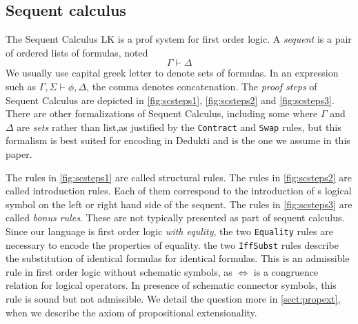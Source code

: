 \documentclass{article}
\begin{document}
	\iffalse
	We consider first order logic with arbitrary constant function and predicate symbols. Fomally We fix:
	\begin{itemize}
		\item a set of constant symbols $C$ noted $f^j, g^j, h^j, f^j_i,...$ for indices $i\in \mathbb{N}$ and where the superscript $j$ denotes the \textit{arity} of the symbol
		\item a countably infinite set of schematic function symbols $'C$ noted $ 'f^j, 'g^j, 'h^j, f^j_i,...$ for indices $i\in \mathbb{N}$ and where the superscript $j$ denotes the \textit{arity} of the symbol.
	\end{itemize}
	We also call schematic functions symbols of arity 0 \textit{variables}, and note them $x,y,z$.
	The set of terms of height at most $n$ is
	$$\mathcal{T}_0 := \lbrace f^0 \mid f^0 \in C\rbrace \cup \lbrace 'f^0 \mid 'f^0 \in C \rbrace$$
	$$\mathcal{T}_{n+1} := \mathcal{T}_n \cup \lbrace f^j(\vec{t}) \mid f^j\in \mathcal{C}, \vec{t}\in \mathcal{T}_n^j, j>0 \rbrace \cup \lbrace 'f^j(\vec{t}) \mid 'f^j\in \mathcal{C}, \vec{t}\in \mathcal{T}_n^j, j>0 \rbrace$$
	and the set of all termsis $\mathcal T = \bigcup_{n=0}^\infty \mathcal{T}_n$.  Moreover, we allow \textit{schematic functions, predicate and connector symbols}.
	
	\fi
	\subsection{Sequent calculus}
	The Sequent Calculus LK is a prof system for first order logic. A \textit{sequent} is a pair of ordered lists of formulas, noted
	$$
	\Gamma \vdash \Delta
	$$
	We usually use capital greek letter to denote sets of formulas. In an expression such as $\Gamma, \Sigma \vdash \phi, \Delta$, the comma denotes concatenation.
	The \textit{proof steps} of Sequent Calculus are depicted in \autoref{fig:scsteps1}, \autoref{fig:scsteps2} and \autoref{fig:scsteps3}. There are other formalizations of Sequent Calculus, including some where $\Gamma$ and $\Delta$ are \textit{sets} rather than list,as justified by the \texttt{Contract} and \texttt{Swap} rules, but this formalism is best suited for encoding in Dedukti and is the one we assume in this paper.
	
	The rules in \autoref{fig:scsteps1} are called structural rules. The rules in \autoref{fig:scsteps2} are called introduction rules. Each of them correspond to the introduction of s logical symbol on the left or right hand side of the sequent.
	The rules in \autoref{fig:scsteps3} are called \textit{bonus rules}. These are not typically presented as part of sequent calculus. Since our language is first order logic \textit{with equlity}, the two \texttt{Equality} rules are necessary to encode the properties of equality. the two \texttt{IffSubst} rules describe the substitution of identical formulas for identical formulas. This is an admissible rule in first order logic without schematic symbols, as $\iff$ is a congruence relation for logical operators. In presence of schematic connector symbols, this rule is sound but not admissible. We detail the question more in \autoref{sect:propext}, when we describe the axiom of propositional extensionality.
	
\end{document}
